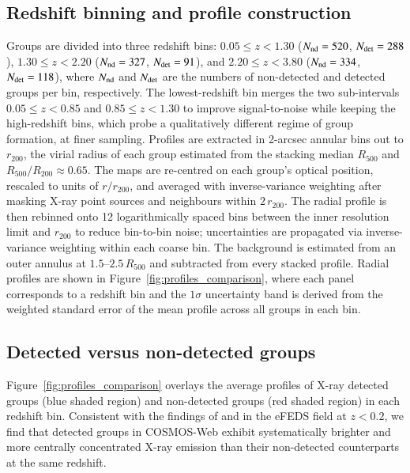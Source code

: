 \documentclass{aa}
\begin{document}
\begin{appendix}
\subsection{Redshift binning and profile construction}
\label{sec:profile_zbins}

Groups are divided into three redshift bins: $0.05 \leq z < 1.30$
($N_{\rm nd} = 520$, $N_{\rm det} = 288$),
$1.30 \leq z < 2.20$ ($N_{\rm nd} = 327$, $N_{\rm det} = 91$), and
$2.20 \leq z < 3.80$ ($N_{\rm nd} = 334$, $N_{\rm det} = 118$),
where $N_{\rm nd}$ and $N_{\rm det}$ are the numbers of non-detected
and detected groups per bin, respectively.
The lowest-redshift bin merges the two sub-intervals $0.05 \leq z < 0.85$
and $0.85 \leq z < 1.30$ to improve signal-to-noise while keeping the
high-redshift bins, which probe a qualitatively different regime of
group formation, at finer sampling.
Profiles are extracted in 2-arcsec annular bins out to $r_{200}$, the virial
radius of each group estimated from the stacking median $R_{500}$ and
$R_{500}/R_{200} \approx 0.65$.  The maps are re-centred on each group's
optical position, rescaled to units of $r/r_{200}$, and averaged with
inverse-variance weighting after masking X-ray point sources and
neighbours within $2\,r_{200}$.  The radial profile is then rebinned onto
12 logarithmically spaced bins between the inner resolution limit and
$r_{200}$ to reduce bin-to-bin noise; uncertainties are propagated via
inverse-variance weighting within each coarse bin.
The background is estimated from an outer annulus at $1.5$--$2.5\,R_{500}$
and subtracted from every stacked profile.
Radial profiles are shown in Figure~\ref{fig:profiles_comparison}, where
each panel corresponds to a redshift bin and the $1\sigma$ uncertainty band
is derived from the weighted standard error of the mean profile across all
groups in each bin.

\subsection{Detected versus non-detected groups}
\label{sec:profiles_det_vs_nondet}

Figure~\ref{fig:profiles_comparison} overlays the average profiles of
X-ray detected groups (blue shaded region) and non-detected groups (red
shaded region) in each redshift bin.  Consistent with the findings of
\citet{Popesso2024} and \citet{Popesso2025} in the eFEDS field at $z < 0.2$,
we find that detected groups in COSMOS-Web exhibit systematically brighter
and more centrally concentrated X-ray emission than their non-detected
counterparts at the same redshift.


\end{appendix}
\end{document}
